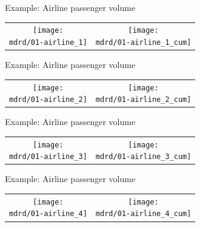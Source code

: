 \begin{frame}{Example: Airline passenger volume}
\newcommand{\wmgd}{0.5\columnwidth}
\newcommand{\hmgd}{3.0cm}
\newcommand{\mdrd}{../figures/01-airline}
\newcommand{\mbm}{\hspace{-0.3cm}}
{\footnotesize

}

\vspace{\baselineskip}

\begin{tabular}{cc}
\mbm \texttt{[image: \\mdrd/01-airline\_1]} & \texttt{[image: \\mdrd/01-airline\_1\_cum]}
\end{tabular}
\end{frame}

\begin{frame}{Example: Airline passenger volume}
\newcommand{\wmgd}{0.5\columnwidth}
\newcommand{\hmgd}{3.0cm}
\newcommand{\mdrd}{../figures/01-airline}
\newcommand{\mbm}{\hspace{-0.3cm}}
{\footnotesize

}

\vspace{\baselineskip}

\begin{tabular}{cc}
\mbm \texttt{[image: \\mdrd/01-airline\_2]} & \texttt{[image: \\mdrd/01-airline\_2\_cum]}
\end{tabular}
\end{frame}

\begin{frame}{Example: Airline passenger volume}
\newcommand{\wmgd}{0.5\columnwidth}
\newcommand{\hmgd}{3.0cm}
\newcommand{\mdrd}{../figures/01-airline}
\newcommand{\mbm}{\hspace{-0.3cm}}
{\footnotesize

}

\vspace{\baselineskip}

\begin{tabular}{cc}
\mbm \texttt{[image: \\mdrd/01-airline\_3]} & \texttt{[image: \\mdrd/01-airline\_3\_cum]}
\end{tabular}
\end{frame}

\begin{frame}{Example: Airline passenger volume}
\newcommand{\wmgd}{0.5\columnwidth}
\newcommand{\hmgd}{3.0cm}
\newcommand{\mdrd}{../figures/01-airline}
\newcommand{\mbm}{\hspace{-0.3cm}}
{\footnotesize

}

\vspace{\baselineskip}

\begin{tabular}{cc}
\mbm \texttt{[image: \\mdrd/01-airline\_4]} & \texttt{[image: \\mdrd/01-airline\_4\_cum]}
\end{tabular}
\end{frame}

